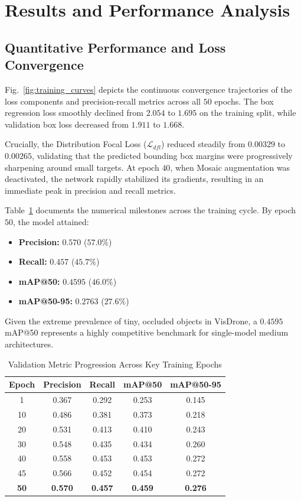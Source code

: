 \documentclass[conference]{IEEEtran}
\begin{document}
\section{Results and Performance Analysis}

\subsection{Quantitative Performance and Loss Convergence}
Fig.~\ref{fig:training_curves} depicts the continuous convergence trajectories of the loss components and precision-recall metrics across all $50$ epochs. The box regression loss smoothly declined from $2.054$ to $1.695$ on the training split, while validation box loss decreased from $1.911$ to $1.668$. 

Crucially, the Distribution Focal Loss ($\mathcal{L}_{dfl}$) reduced steadily from $0.00329$ to $0.00265$, validating that the predicted bounding box margins were progressively sharpening around small targets. At epoch $40$, when Mosaic augmentation was deactivated, the network rapidly stabilized its gradients, resulting in an immediate peak in precision and recall metrics.

Table~\ref{tab:training_evolution} documents the numerical milestones across the training cycle. By epoch $50$, the model attained:
\begin{itemize}
    \item \textbf{Precision:} $0.570$ ($57.0\%$)
    \item \textbf{Recall:} $0.457$ ($45.7\%$)
    \item \textbf{mAP@50:} $0.4595$ ($46.0\%$)
    \item \textbf{mAP@50-95:} $0.2763$ ($27.6\%$)
\end{itemize}

Given the extreme prevalence of tiny, occluded objects in VisDrone, a $0.4595$ mAP@50 represents a highly competitive benchmark for single-model medium architectures.

\begin{table}[!t]
\caption{Validation Metric Progression Across Key Training Epochs}
\label{tab:training_evolution}
\centering
\begin{tabular}{ccccc}
\toprule
\textbf{Epoch} & \textbf{Precision} & \textbf{Recall} & \textbf{mAP@50} & \textbf{mAP@50-95} \\
\midrule
1  & 0.367 & 0.292 & 0.253 & 0.145 \\
10 & 0.486 & 0.381 & 0.373 & 0.218 \\
20 & 0.531 & 0.413 & 0.410 & 0.243 \\
30 & 0.548 & 0.435 & 0.434 & 0.260 \\
40 & 0.558 & 0.453 & 0.453 & 0.272 \\
45 & 0.566 & 0.452 & 0.454 & 0.272 \\
\textbf{50} & \textbf{0.570} & \textbf{0.457} & \textbf{0.459} & \textbf{0.276} \\
\bottomrule
\end{tabular}
\end{table}
\end{document}
